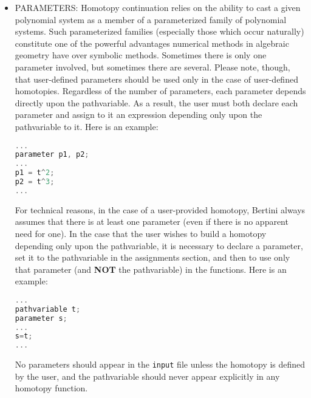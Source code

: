 \begin{itemize}
\item{PARAMETERS:}
Homotopy continuation relies on the ability to cast a given polynomial system as a member of a parameterized family of polynomial systems. Such parameterized families (especially those which occur naturally) constitute one of the powerful advantages numerical methods in algebraic geometry have over symbolic methods. Sometimes there is only one parameter involved, but sometimes there are several. Please note, though, that user-defined parameters should be used only in the case of user-defined homotopies. Regardless of the number of parameters, each parameter depends directly upon the pathvariable. As a result, the user must both declare each parameter and assign to it an expression depending only upon the pathvariable to it. Here is an example:
\begin{center}\begin{minipage}{0.9\linewidth}

\begin{lstlisting}[language=c++, caption=Adapted from \cite{BM13}, captionpos=b]
...
parameter p1, p2;
...
p1 = t^2;
p2 = t^3;
...
\end{lstlisting}
\end{minipage}\end{center}

For technical reasons, in the case of a user-provided homotopy, Bertini always assumes that there is at least one parameter (even if there is no apparent need for one). In the case that the user wishes to build a homotopy depending only upon the pathvariable, it is necessary to declare a parameter, set it to the pathvariable in the assignments section, and then to use only that parameter (and \textbf{NOT} the pathvariable) in the functions. Here is an example:
\begin{center}\begin{minipage}{0.9\linewidth}

\begin{lstlisting}[language=c++, caption=Adapted from \cite{BM13}, captionpos=b]
...
pathvariable t;
parameter s;
...
s=t;
...
\end{lstlisting}
\end{minipage}\end{center}

No parameters should appear in the \texttt{input} file unless the homotopy is defined by the user, and the pathvariable should never appear explicitly in any homotopy function.


\end{itemize}
